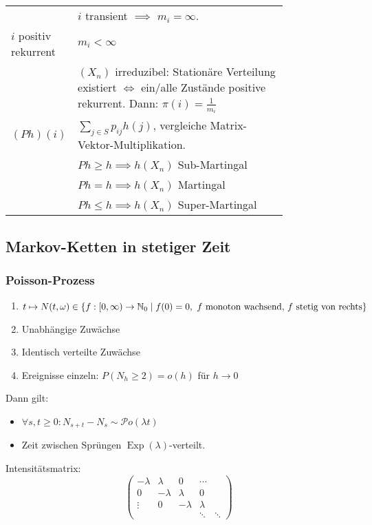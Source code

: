 \documentclass[a4paper,DIV15]{scrartcl}
\begin{document}
\begin{longtable}[h]{lp{0.8\linewidth}}
	& $i$ transient $\implies$ $m_i=\infty$.\\
$i$ positiv rekurrent 
	& $m_i<\infty$ \\
	& $(X_n)$ irreduzibel: Stationäre Verteilung existiert $\iff$ ein/alle Zustände positive rekurrent. Dann: $\pi(i)=\frac1{m_i}$ \\
$(Ph)(i)$
	& $\sum_{j\in S} p_{ij}h(j)$, vergleiche Matrix-Vektor-Multiplikation. \\
	& $Ph \ge h \implies h(X_n)$ Sub-Martingal\\
	& $Ph = h \implies h(X_n)$ Martingal\\
	& $Ph \le h \implies h(X_n)$ Super-Martingal\\
\end{longtable}

\subsection{Markov-Ketten in stetiger Zeit}

\subsubsection{Poisson-Prozess}
\begin{enumerate}[({A}1)]
\item $t\mapsto N(t,\omega)\in \{f:[0,\infty) \to \mathbb{N}_0\mid f(0)=0,\text{ $f$ monoton wachsend, $f$ stetig von rechts}\}$
\item Unabhängige Zuwächse
\item Identisch verteilte Zuwächse
\item Ereignisse einzeln: $P(N_h\ge 2) = o(h)$ für $h\to 0$
\end{enumerate}

Dann gilt:
\begin{itemize}
\item $\forall s,t\ge 0:N_{s+t}-N_s \sim \mathcal Po(\lambda t)$
\item Zeit zwischen Sprüngen $\operatorname{Exp}(\lambda)$-verteilt.
\end{itemize}

Intensitätsmatrix:
\[
\begin{pmatrix}
-\lambda & \lambda & 0 & \cdots \\
0 & -\lambda & \lambda & 0 & \\
\vdots & 0 & -\lambda & \lambda & \\
& & & \ddots & \ddots 
\end{pmatrix}
\]
\end{document}
